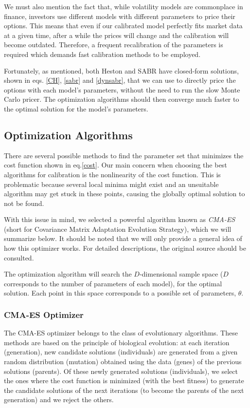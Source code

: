 We must also mention the fact that, while volatility models are commonplace in finance, investors use different models with different parameters to price their options. This means that even if our calibrated model perfectly fits market data at a given time, after a while the prices will change and the calibration will become outdated. Therefore, a frequent recalibration of the parameters is required which demands fast calibration methods to be employed.


Fortunately, as mentioned, both Heston and SABR have closed-form solutions, shown in eqs. \eqref{CH}, \eqref{sabr} and \eqref{dynsabr}, that we can use to directly price the options with each model's parameters, without the need to run the slow Monte Carlo pricer. The optimization algorithms should then converge much faster to the optimal solution for the model's parameters.





\subsection{Optimization Algorithms}
There are several possible methods to find the parameter set that minimizes the cost function shown in eq.\eqref{cost}.
Our main concern when choosing the best algorithms for calibration is the nonlinearity of the cost function. This is problematic because several local minima might exist and an unsuitable algorithm may get stuck in these points, causing the globally optimal solution to not be found.

With this issue in mind, we selected a powerful algorithm known as \emph{CMA-ES}~\cite{Hansen2} (short for Covariance Matrix Adaptation Evolution Strategy), which we will summarize below. It should be noted that we will only provide a general idea of how this optimizer works. For detailed descriptions, the original source should be consulted.

The optimization algorithm will search the $D$-dimensional sample space ($D$ corresponds to the number of parameters of each model), for the optimal solution. Each point in this space corresponds to a possible set of parameters, $\theta$.




\subsubsection{CMA-ES Optimizer}
The CMA-ES optimizer belongs to the class of evolutionary algorithms. These methods are based on the principle of biological evolution: at each iteration (generation), new candidate solutions (individuals) are generated from a given random distribution (mutation) obtained using the data (genes) of the previous solutions (parents). Of these newly generated solutions (individuals), we select the ones where the cost function is minimized (with the best fitness) to generate the candidate solutions of the next iterations (to become the parents of the next generation) and we reject the others.



